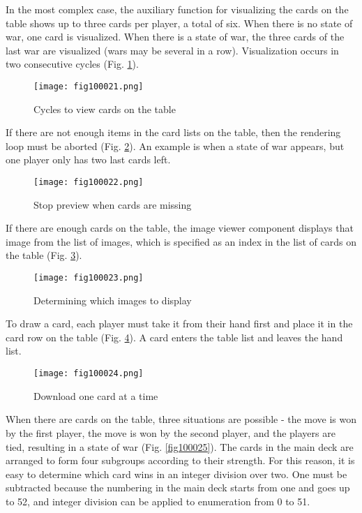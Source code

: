 In the most complex case, the auxiliary function for visualizing the cards on the table shows up to three cards per player, a total of six. When there is no state of war, one card is visualized. When there is a state of war, the three cards of the last war are visualized (wars may be several in a row). Visualization occurs in two consecutive cycles (Fig. \ref{fig100021}).

\begin{figure}[H]
   \centering
   \texttt{[image: fig100021.png]}
   \caption{Cycles to view cards on the table}
\label{fig100021}
\end{figure}

If there are not enough items in the card lists on the table, then the rendering loop must be aborted (Fig. \ref{fig100022}). An example is when a state of war appears, but one player only has two last cards left.

\begin{figure}[H]
   \centering
   \texttt{[image: fig100022.png]}
   \caption{Stop preview when cards are missing}
\label{fig100022}
\end{figure}

If there are enough cards on the table, the image viewer component displays that image from the list of images, which is specified as an index in the list of cards on the table (Fig. \ref{fig100023}).

\begin{figure}[H]
   \centering
   \texttt{[image: fig100023.png]}
   \caption{Determining which images to display}
\label{fig100023}
\end{figure}

To draw a card, each player must take it from their hand first and place it in the card row on the table (Fig. \ref{fig100024}). A card enters the table list and leaves the hand list.

\begin{figure}[H]
   \centering
   \texttt{[image: fig100024.png]}
   \caption{Download one card at a time}
\label{fig100024}
\end{figure}

When there are cards on the table, three situations are possible - the move is won by the first player, the move is won by the second player, and the players are tied, resulting in a state of war (Fig. \ref{fig100025}). The cards in the main deck are arranged to form four subgroups according to their strength. For this reason, it is easy to determine which card wins in an integer division over two. One must be subtracted because the numbering in the main deck starts from one and goes up to 52, and integer division can be applied to enumeration from 0 to 51.

